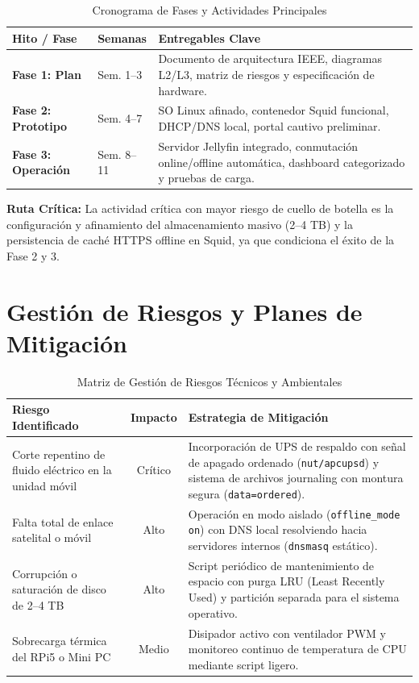 \documentclass[conference]{IEEEtran}
\begin{document}
\begin{table}[htbp]
\caption{Cronograma de Fases y Actividades Principales}
\begin{center}
\begin{tabularx}{\columnwidth}{l l X}
\toprule
\textbf{Hito / Fase} & \textbf{Semanas} & \textbf{Entregables Clave} \\
\midrule
\textbf{Fase 1: Plan} & Sem. 1--3 & Documento de arquitectura IEEE, diagramas L2/L3, matriz de riesgos y especificación de hardware. \\
\textbf{Fase 2: Prototipo} & Sem. 4--7 & SO Linux afinado, contenedor Squid funcional, DHCP/DNS local, portal cautivo preliminar. \\
\textbf{Fase 3: Operación} & Sem. 8--11 & Servidor Jellyfin integrado, conmutación online/offline automática, dashboard categorizado y pruebas de carga. \\
\bottomrule
\end{tabularx}
\end{center}
\label{tab:schedule}
\end{table}

\textbf{Ruta Crítica:} La actividad crítica con mayor riesgo de cuello de botella es la configuración y afinamiento del almacenamiento masivo (2--4 TB) y la persistencia de caché HTTPS offline en Squid, ya que condiciona el éxito de la Fase 2 y 3.

\section{Gestión de Riesgos y Planes de Mitigación}

\begin{table}[htbp]
\caption{Matriz de Gestión de Riesgos Técnicos y Ambientales}
\begin{center}
\begin{tabularx}{\columnwidth}{l c X}
\toprule
\textbf{Riesgo Identificado} & \textbf{Impacto} & \textbf{Estrategia de Mitigación} \\
\midrule
Corte repentino de fluido eléctrico en la unidad móvil & Crítico & Incorporación de UPS de respaldo con señal de apagado ordenado (\texttt{nut/apcupsd}) y sistema de archivos journaling con montura segura (\texttt{data=ordered}). \\
Falta total de enlace satelital o móvil & Alto & Operación en modo aislado (\texttt{offline\_mode on}) con DNS local resolviendo hacia servidores internos (\texttt{dnsmasq} estático). \\
Corrupción o saturación de disco de 2--4 TB & Alto & Script periódico de mantenimiento de espacio con purga LRU (Least Recently Used) y partición separada para el sistema operativo. \\
Sobrecarga térmica del RPi5 o Mini PC & Medio & Disipador activo con ventilador PWM y monitoreo continuo de temperatura de CPU mediante script ligero. \\
\bottomrule
\end{tabularx}
\end{center}
\label{tab:risk_matrix}
\end{table}
\end{document}
